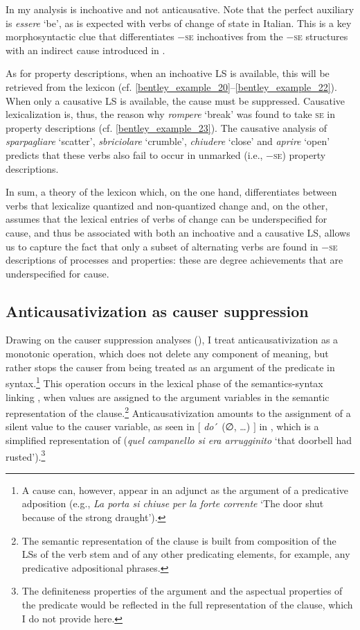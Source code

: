 \documentclass[output=paper,colorlinks,citecolor=brown
]{langscibook}
\begin{document}
In my analysis  is inchoative and not anticausative. Note that the perfect auxiliary is \textit{essere} ‘be’, as is expected with verbs of change of state in Italian. This is a key morphosyntactic clue that differentiates −\textsc{se} inchoatives from the −\textsc{se} structures with an indirect cause introduced in . 

As for property descriptions, when an inchoative LS is available, this will be retrieved from the
lexicon (cf. \ref{bentley_example_20}--\ref{bentley_example_22}). When only a causative LS is available, the cause must be suppressed. Causative lexicalization is, thus, the reason why \textit{rompere} ‘break’ was found to take \textsc{se} in property descriptions (cf. \ref{bentley_example_23}). The causative analysis of \textit{sparpagliare} ‘scatter’, \textit{sbriciolare} ‘crumble’, \textit{chiudere} ‘close’ and \textit{aprire} ‘open’ predicts that these verbs also fail to occur in unmarked (i.e., −\textsc{se}) property descriptions.

In sum, a theory of the lexicon which, on the one hand, differentiates between verbs that lexicalize quantized and non-quantized change and, on the other, assumes that the lexical entries of verbs of change can be underspecified for cause, and thus be associated with both an inchoative and a causative LS, allows us to capture the fact that only a subset of alternating verbs are found in −\textsc{se} descriptions of processes and properties: these are degree achievements that are underspecified for cause.

\subsection{Anticausativization as causer suppression}
\label{bentley_section_5.4}

Drawing on the causer suppression analyses (), I treat anticausativization as a monotonic
operation, which does not delete any component of meaning, but rather stops the causer from being
treated as an argument of the predicate in syntax.\footnote{A cause can, however, appear in an
  adjunct as the argument of a predicative adposition (e.g., \textit{La porta si chiuse per la forte
    corrente} ‘The door shut because of the strong draught’).}  This operation occurs in the
lexical phase of the semantics-syntax linking \citep[116--125]{vanvalin2023principles}, when values
are assigned to the argument variables in the semantic representation of the clause.\footnote{The
  semantic representation of the clause is built from composition of the LSs of the verb stem and of
  any other predicating elements, for example, any predicative adpositional
  phrases.} Anticausativization amounts to the assignment of a silent value to the causer variable,
as seen in $\lbrack$ \textit{do}´ (∅,  \ldots) $\rbrack$ in , which is a simplified representation of  (\textit{quel campanello si era arrugginito} ‘that doorbell had rusted’).\footnote{The definiteness properties of the argument and the aspectual properties of the predicate would be reflected in the full representation of the clause, which I do not provide here.}
\end{document}
